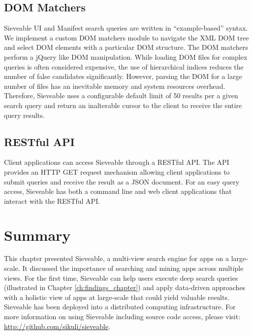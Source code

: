 \subsection{DOM Matchers}

Sieveable UI and Manifest search queries are written in  ``example-based'' syntax.
We implement a custom DOM matchers module to navigate the XML DOM tree and select DOM elements with a particular DOM structure.
The DOM matchers perform a jQuery like DOM manipulation.
While loading DOM files for complex queries is often considered expensive, the use of hierarchical indices reduces the number of false candidates significantly.
However, parsing the DOM for a large number of files has an inevitable memory and system resources overhead.
Therefore, Sieveable uses a configurable default limit of 50 results per a given search query and return an inalterable cursor to the client to receive the entire query results.

\subsection{RESTful API}
Client applications can access Sieveable through a RESTful API.
The API provides an HTTP GET request mechanism allowing client applications to submit queries and receive the result as a JSON document.
For an easy query access, Sieveable has both a command line and web client applications that interact with the RESTful API.

\section{Summary}
This chapter presented Sieveable, a multi-view search engine for apps on a large-scale.
It discussed the importance of searching and mining apps across multiple views.
For the first time, Sieveable can help users execute deep search queries (illustrated in Chapter \ref{ch:findings_chapter}) and apply data-driven approaches with a holistic view of apps at large-scale that could yield valuable results.
Sieveable has been deployed into a distributed computing infrastructure.
For more information on using Sieveable including source code access, please visit:
\url{http://github.com/sikuli/sieveable}.
